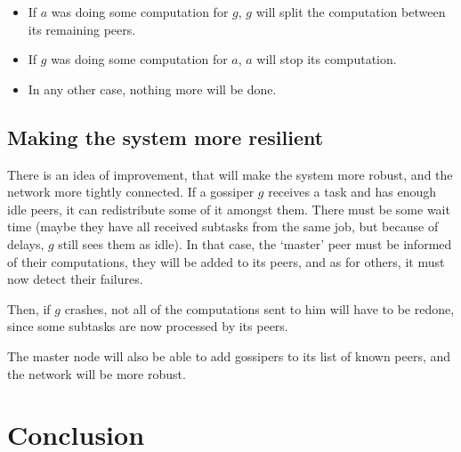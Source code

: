 \documentclass[a4paper,12pt]{article}
\begin{document}
\begin{itemize}
\item If $a$ was doing some computation for $g$, $g$ will split the computation between its remaining peers.
\item If $g$ was doing some computation for $a$, $a$ will stop its computation.
\item In any other case, nothing more will be done. 
\end{itemize}

    \subsection{Making the system more resilient}
    There is an idea of improvement, that will make the system more robust, and the network more tightly connected.
    If a gossiper $g$ receives a task and has enough idle peers, it can redistribute some of it amongst them. There must be some wait time (maybe they have all received subtasks from the same job, but because of delays, $g$ still sees them as idle).
In that case, the ‘master’ peer must be informed of their computations, they will be added to its peers, and as for others, it must now detect their failures.

    Then, if $g$ crashes, not all of the computations sent to him will have to be redone, since some subtasks are now processed by its peers.

    The master node will also be able to add gossipers to its list of known peers, and the network will be more robust.

\section{Conclusion}
\end{document}
